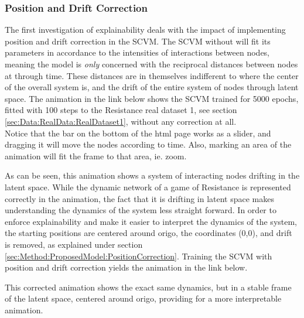 \subsubsection{Position and Drift Correction}
\label{sec:ResearchQuestion3:PositionCorrection}
The first investigation of explainability deals with the impact of implementing position and drift correction in the SCVM.
The SCVM without will fit its parameters in accordance to the intensities of interactions between nodes, meaning the model is \textit{only} concerned with the reciprocal distances between nodes at through time.
These distances are in themselves indifferent to where the center of the overall system is, and the drift of the entire system of nodes through latent space.
The animation in the link below shows the SCVM trained for 5000 epochs, fitted with 100 steps to the Resistance real dataset 1, see section \ref{sec:Data:RealData:RealDataset1}, without any correction at all.
\\
Notice that the bar on the bottom of the html page works as a slider, and dragging it will move the nodes according to time. 
Also, marking an area of the animation will fit the frame to that area, ie. zoom.
\begin{center}
\end{center}
\noindent
As can be seen, this animation shows a system of interacting nodes drifting in the latent space.
While the dynamic network of a game of Resistance is represented correctly in the animation, the fact that it is drifting in latent space makes understanding the dynamics of the system less straight forward.
In order to enforce explainability and make it easier to interpret the dynamics of the system, the starting positions are centered around origo, the coordinates (0,0), and drift is removed, as explained under section \ref{sec:Method:ProposedModel:PositionCorrection}.
Training the SCVM with position and drift correction yields the animation in the link below.
\begin{center}
\end{center}
\noindent
This corrected animation shows the exact same dynamics, but in a stable frame of the latent space, centered around origo, providing for a more interpretable animation.


